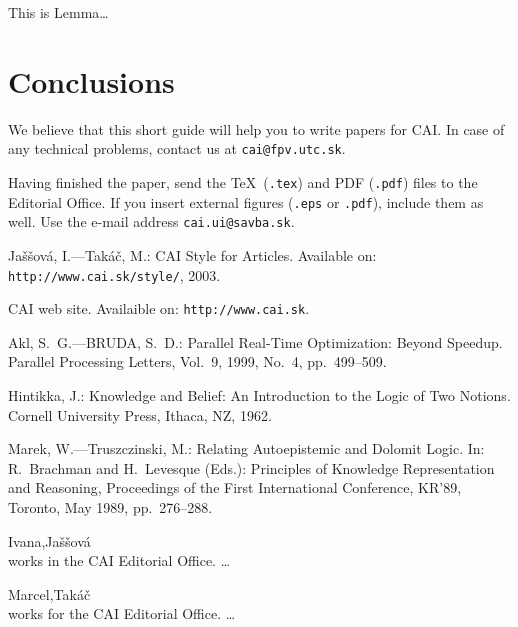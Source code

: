 \documentclass{cai}
\begin{document}
\begin{lemma}[Hopcroft]
This is Lemma\dots
\end{lemma}


\section{Conclusions}

We believe that this short guide will help you to write papers for CAI. In case of any technical problems,
contact us at \texttt{cai@fpv.utc.sk}.

Having finished the paper, send the \TeX\ (\texttt{.tex}) and PDF (\texttt{.pdf}) files to the
Editorial Office. If you insert external figures (\texttt{.eps} or \texttt{.pdf}), include them as well. Use the e-mail
address \texttt{cai.ui@savba.sk}.


\begin{thebibliography}{99}
Ja\v{s}\v{s}ov\'a, I.---Tak\'a\v{c}, M.: CAI Style for Articles. Available on:
\texttt{http://www.cai.sk/style/}, 2003.

CAI web site. Availaible on\hbox{:} \texttt{http://www.cai.sk}.

Akl, S.~G.---BRUDA, S.~D.: Parallel Real-Time Optimization: Beyond Speedup. Parallel Processing Letters,
Vol.~9, 1999, No.~4, pp.~499--509.

Hintikka, J.: Knowledge and Belief: An Introduction to the Logic of Two Notions. Cornell University Press,
Ithaca, NZ, 1962.

Marek, W.---Truszczinski, M.: Relating Autoepistemic and Dolomit Logic. In: R.~Brachman and H.~Levesque
(Eds.): Principles of Knowledge Representation and Reasoning, Proceedings of the First International
Conference, KR'89, Toronto, May 1989, pp.~276--288.
\end{thebibliography}


\bio{}Ivana,Ja\v{s}\v{s}ov\'a\\ works in the CAI Editorial Office. \dots

\bio{}Marcel,Tak\'a\v{c}\\ works for the CAI Editorial Office. \dots


\label{lastpage}


\end{document}
